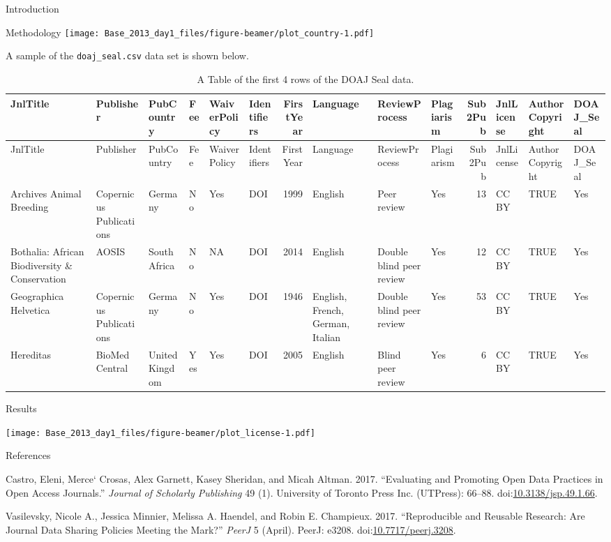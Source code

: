\documentclass[ignorenonframetext,]{beamer}
\begin{document}
\begin{frame}[fragile]{Introduction}
\begin{block}{Methodology}
\texttt{[image: Base\_2013\_day1\_files/figure-beamer/plot\_country-1.pdf]}

A sample of the \texttt{doaj\_seal.csv} data set is shown below.

\begin{longtable}[]{@{}llllllrlllrlll@{}}
\caption{A Table of the first 4 rows of the DOAJ Seal
data.}\tabularnewline
\toprule
JnlTitle & Publisher & PubCountry & Fee & WaiverPolicy & Identifiers &
FirstYear & Language & ReviewProcess & Plagiarism & Sub2Pub & JnlLicense
& AuthorCopyright & DOAJ\_Seal\tabularnewline
\midrule
\endfirsthead
\toprule
JnlTitle & Publisher & PubCountry & Fee & WaiverPolicy & Identifiers &
FirstYear & Language & ReviewProcess & Plagiarism & Sub2Pub & JnlLicense
& AuthorCopyright & DOAJ\_Seal\tabularnewline
\midrule
\endhead
Archives Animal Breeding & Copernicus Publications & Germany & No & Yes
& DOI & 1999 & English & Peer review & Yes & 13 & CC BY & TRUE &
Yes\tabularnewline
Bothalia: African Biodiversity \& Conservation & AOSIS & South Africa &
No & NA & DOI & 2014 & English & Double blind peer review & Yes & 12 &
CC BY & TRUE & Yes\tabularnewline
Geographica Helvetica & Copernicus Publications & Germany & No & Yes &
DOI & 1946 & English, French, German, Italian & Double blind peer review
& Yes & 53 & CC BY & TRUE & Yes\tabularnewline
Hereditas & BioMed Central & United Kingdom & Yes & Yes & DOI & 2005 &
English & Blind peer review & Yes & 6 & CC BY & TRUE &
Yes\tabularnewline
\bottomrule
\end{longtable}

\end{block}

\end{frame}

\begin{frame}{Results}

\texttt{[image: Base\_2013\_day1\_files/figure-beamer/plot\_license-1.pdf]}

\end{frame}

\begin{frame}{References}

\hypertarget{refs}{}
\hypertarget{ref-Castro_2017}{}
Castro, Eleni, Merce` Crosas, Alex Garnett, Kasey Sheridan, and Micah
Altman. 2017. ``Evaluating and Promoting Open Data Practices in Open
Access Journals.'' \emph{Journal of Scholarly Publishing} 49 (1).
University of Toronto Press Inc. (UTPress): 66--88.
doi:\href{https://doi.org/10.3138/jsp.49.1.66}{10.3138/jsp.49.1.66}.

\hypertarget{ref-Vasilevsky_2017}{}
Vasilevsky, Nicole A., Jessica Minnier, Melissa A. Haendel, and Robin E.
Champieux. 2017. ``Reproducible and Reusable Research: Are Journal Data
Sharing Policies Meeting the Mark?'' \emph{PeerJ} 5 (April). PeerJ:
e3208.
doi:\href{https://doi.org/10.7717/peerj.3208}{10.7717/peerj.3208}.

\end{frame}
\end{document}
